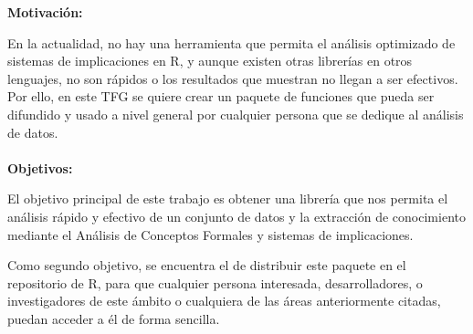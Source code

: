 \textbf{Motivaci\'on:}

En la actualidad, no hay una herramienta que permita el an\'alisis 
optimizado de sistemas de implicaciones en R, y aunque existen otras 
librer\'ias en otros lenguajes, no son r\'apidos o los resultados que 
muestran no llegan a ser efectivos.
Por ello, en este TFG se quiere crear un paquete de funciones que pueda 
ser difundido y usado a nivel general por cualquier persona que se dedique 
al an\'alisis de datos.
\\
\\


\textbf{Objetivos:}

El objetivo principal de este trabajo es obtener una librer\'ia que 
nos permita el an\'alisis r\'apido y efectivo de un conjunto de datos 
y la extracci\'on de conocimiento mediante el An\'alisis de Conceptos 
Formales y sistemas de implicaciones.

Como segundo objetivo, se encuentra el de distribuir este paquete en el repositorio 
de R, para que cualquier persona interesada, desarrolladores, o investigadores de este \'ambito o cualquiera 
de las \'areas anteriormente citadas, puedan acceder a \'el de forma sencilla.
\\
\\


\newpage
\thispagestyle{empty}
\mbox{}

\newpage